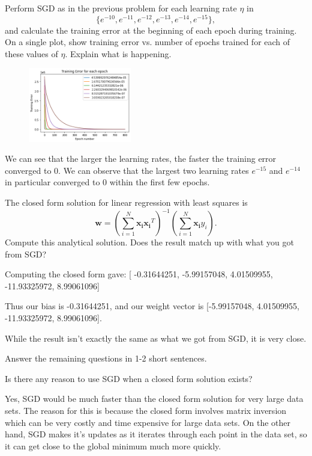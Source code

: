 \begin{problem}[2]
  Perform SGD as in the previous problem for each learning rate $\eta$ in \[\{e^{-10}, e^{-11}, e^{-12}, e^{-13}, e^{-14}, e^{-15}\},\] and calculate the training error at the beginning of each epoch during training.  On a single plot, show training error vs. number of epochs trained for each of these values of $\eta$. Explain what is happening.
\end{problem}
\begin{solution}
  \begin{figure}[H]
    \centering
    \includegraphics[width=0.4\textwidth]{images/3_2_plot.png}
  \end{figure}
  We can see that the larger the learning rates, the faster the training error converged to 0. We can observe that the largest two learning rates $e^{-15}$ and $e^{-14}$ in particular converged to 0 within the first few epochs.
\end{solution}


\begin{problem}[2]
  The closed form solution for linear regression with least squares is \[\mathbf{w} = \left(\sum_{i=1}^N \mathbf{x_i}\mathbf{x_i}^T\right)^{-1}\left(\sum_{i=1}^N \mathbf{x_i}y_i\right).\]  Compute this analytical solution.  Does the result match up with what you got from SGD?
\end{problem}
\begin{solution}
  Computing the closed form gave:
  [ -0.31644251,  -5.99157048,   4.01509955, -11.93325972,
  8.99061096]

  Thus our bias is -0.31644251, and our weight vector is [-5.99157048,   4.01509955, -11.93325972,
  8.99061096].

   While the result isn't exactly the same as what we got from SGD, it is very close.
\end{solution}

Answer the remaining questions in 1-2 short sentences.

\begin{problem}[2]
  Is there any reason to use SGD when a closed form solution exists?
\end{problem}
\begin{solution}
  Yes, SGD would be much faster than the closed form solution for very large data sets. The reason for this is because the closed form involves matrix inversion which can be very costly and time expensive for large data sets. On the other hand, SGD makes it's updates as it iterates through each point in the data set, so it can get close to the global minimum much more quickly.
\end{solution}

